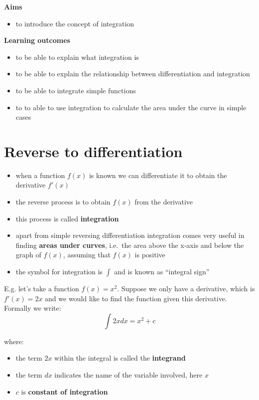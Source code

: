 \documentclass[
]{book}
\providecommand{\tightlist}{%
  \setlength{\itemsep}{0pt}\setlength{\parskip}{0pt}}
\theoremstyle{definition}
\theoremstyle{definition}
\theoremstyle{definition}
\theoremstyle{remark}
\begin{document}
\textbf{Aims}

\begin{itemize}
\tightlist
\item
  to introduce the concept of integration
\end{itemize}

\textbf{Learning outcomes}

\begin{itemize}
\tightlist
\item
  to be able to explain what integration is
\item
  to be able to explain the relationship between differentiation and integration
\item
  to be able to integrate simple functions
\item
  to to able to use integration to calculate the area under the curve in simple cases
\end{itemize}

\hypertarget{reverse-to-differentiation}{%
\section{Reverse to differentiation}\label{reverse-to-differentiation}}

\begin{itemize}
\tightlist
\item
  when a function \(f(x)\) is known we can differentiate it to obtain the derivative \(f'(x)\)
\item
  the reverse process is to obtain \(f(x)\) from the derivative
\item
  this process is called \textbf{integration}
\item
  apart from simple reversing differentiation integration comes very useful in finding \textbf{areas under curves}, i.e.~the area above the x-axis and below the graph of \(f(x)\), assuming that \(f(x)\) is positive
\item
  the symbol for integration is \(\int\) and is known as ``integral sign''
\end{itemize}

E.g. let's take a function \(f(x) = x^2\). Suppose we only have a derivative, which is \(f'(x) = 2x\) and we would like to find the function given this derivative. Formally we write: \[\int 2x dx = x^2 +c\]

where:

\begin{itemize}
\tightlist
\item
  the term \(2x\) within the integral is called the \textbf{integrand}
\item
  the term \(dx\) indicates the name of the variable involved, here \(x\)
\item
  \(c\) is \textbf{constant of integration}
\end{itemize}
\end{document}

